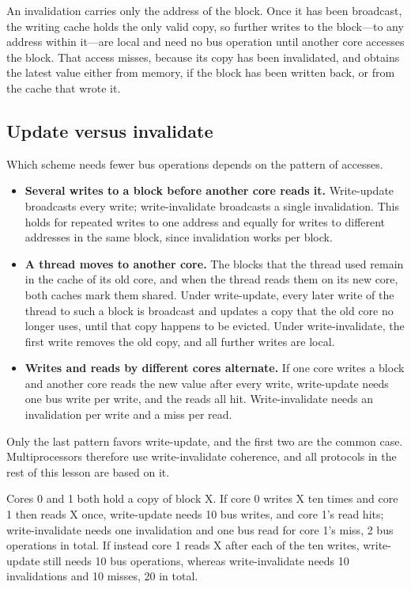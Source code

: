 \documentclass[../main.tex]{subfiles}
\begin{document}
An invalidation carries only the address of the block.  Once it has been
broadcast, the writing cache holds the only valid copy, so further writes to
the block---to any address within it---are local and need no bus operation
until another core accesses the block.  That access misses, because its copy
has been invalidated, and obtains the latest value either from memory, if
the block has been written back, or from the cache that wrote it.

\subsection{Update versus invalidate}

Which scheme needs fewer bus operations depends on the pattern of accesses.
\begin{itemize}
  \item \textbf{Several writes to a block before another core reads it.}
    Write-update broadcasts every write; write-invalidate broadcasts a single
    invalidation.  This holds for repeated writes to one address and equally
    for writes to different addresses in the same block, since invalidation
    works per block.
  \item \textbf{A thread moves to another core.}  The blocks that the thread
    used remain in the cache of its old core, and when the thread reads them
    on its new core, both caches mark them shared.  Under write-update, every
    later write of the thread to such a block is broadcast and updates a copy
    that the old core no longer uses, until that copy happens to be evicted.
    Under write-invalidate, the first write removes the old copy, and all
    further writes are local.
  \item \textbf{Writes and reads by different cores alternate.}  If one core
    writes a block and another core reads the new value after every write,
    write-update needs one bus write per write, and the reads all hit.
    Write-invalidate needs an invalidation per write and a miss per read.
\end{itemize}
Only the last pattern favors write-update, and the first two are the common
case.  Multiprocessors therefore use write-invalidate coherence, and all
protocols in the rest of this lesson are based on it.

\begin{example}
  Cores 0 and 1 both hold a copy of block X.  If core 0 writes X ten times
  and core 1 then reads X once, write-update needs 10 bus writes, and core
  1's read hits;
  write-invalidate needs one invalidation and one bus read for core 1's miss,
  2 bus operations in total.  If instead core 1 reads X after each of the ten
  writes, write-update still needs 10 bus operations, whereas write-invalidate
  needs 10 invalidations and 10 misses, 20 in total.
\end{example}
\end{document}
